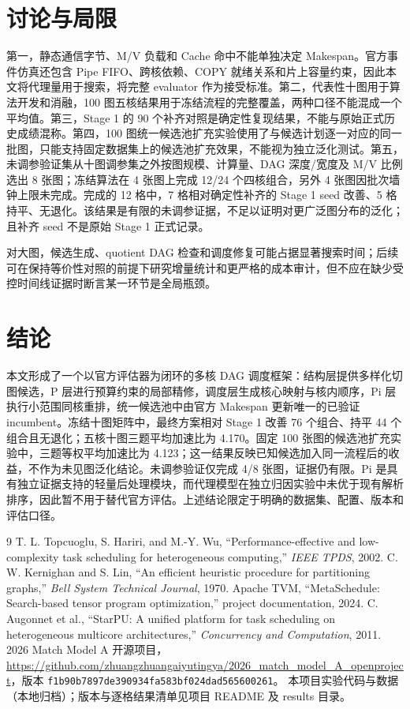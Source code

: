 \documentclass[UTF8,a4paper,11pt]{ctexart}
\begin{document}
\section{讨论与局限}
第一，静态通信字节、M/V 负载和 Cache 命中不能单独决定 Makespan。官方事件仿真还包含 Pipe FIFO、跨核依赖、COPY 就绪关系和片上容量约束，因此本文将代理量用于搜索，将完整 evaluator 作为接受标准。第二，代表性十图用于算法开发和消融，100 图五核结果用于冻结流程的完整覆盖，两种口径不能混成一个平均值。第三，Stage 1 的 90 个补齐对照是确定性复现结果，不能与原始正式历史成绩混称。第四，100 图统一候选池扩充实验使用了与候选计划逐一对应的同一批图，只能支持固定数据集上的候选池扩充效果，不能视为独立泛化测试。第五，未调参验证集从十图调参集之外按图规模、计算量、DAG 深度/宽度及 M/V 比例选出 8 张图；冻结算法在 4 张图上完成 12/24 个四核组合，另外 4 张图因批次墙钟上限未完成。完成的 12 格中，7 格相对确定性补齐的 Stage 1 seed 改善、5 格持平、无退化。该结果是有限的未调参证据，不足以证明对更广泛图分布的泛化；且补齐 seed 不是原始 Stage 1 正式记录。

对大图，候选生成、quotient DAG 检查和调度修复可能占据显著搜索时间；后续可在保持等价性对照的前提下研究增量统计和更严格的成本审计，但不应在缺少受控时间线证据时断言某一环节是全局瓶颈。

\section{结论}
本文形成了一个以官方评估器为闭环的多核 DAG 调度框架：结构层提供多样化切图候选，P 层进行预算约束的局部精修，调度层生成核心映射与核内顺序，Pi 层执行小范围同核重排，统一候选池中由官方 Makespan 更新唯一的已验证 incumbent。冻结十图矩阵中，最终方案相对 Stage 1 改善 76 个组合、持平 44 个组合且无退化；五核十图三题平均加速比为 4.170。固定 100 张图的候选池扩充实验中，三题等权平均加速比为 4.123；这一结果反映已知候选加入同一流程后的收益，不作为未见图泛化结论。未调参验证仅完成 4/8 张图，证据仍有限。Pi 是具有独立证据支持的轻量后处理模块，而代理模型在独立归因实验中未优于现有解析排序，因此暂不用于替代官方评估。上述结论限定于明确的数据集、配置、版本和评估口径。

\begin{thebibliography}{9}
 T. L. Topcuoglu, S. Hariri, and M.-Y. Wu, ``Performance-effective and low-complexity task scheduling for heterogeneous computing,'' \emph{IEEE TPDS}, 2002.
 C. W. Kernighan and S. Lin, ``An efficient heuristic procedure for partitioning graphs,'' \emph{Bell System Technical Journal}, 1970.
 Apache TVM, ``MetaSchedule: Search-based tensor program optimization,'' project documentation, 2024.
 C. Augonnet et al., ``StarPU: A unified platform for task scheduling on heterogeneous multicore architectures,'' \emph{Concurrency and Computation}, 2011.
 2026 Match Model A 开源项目，\url{https://github.com/zhuangzhuangaiyutingya/2026_match_model_A_openproject}，版本 \texttt{f1b90b7897de390934fa583bf024dad565600261}。
 本项目实验代码与数据（本地归档）；版本与逐格结果清单见项目 README 及 results 目录。
\end{thebibliography}
\end{document}
